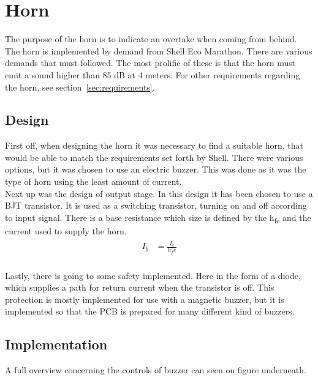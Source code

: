 \section{Horn}
The purpose of the horn is to indicate an overtake when coming from behind. The horn is implemented by demand from Shell Eco Marathon. There are various demands that must followed. The most prolific of these is that the horn must emit a sound higher than 85 dB at 4 meters. For other requirements regarding the horn, see section~\ref{sec:requirements}.  

\subsection{Design}
First off, when designing the horn it was necessary to find a suitable horn, that would be able to match the requirements set forth by Shell. There were various options, but it was chosen to use an electric buzzer. This was done as it was the type of horn using the least amount of current. \\
Next up was the design of output stage. In this design it has been chosen to use a BJT transistor. It is used as a switching transistor, turning on and off according to input signal. There is a base resistance which size is defined by the h\textsubscript{fe} and the current used to supply the horn. \\

\begin{align}
	\begin{split}
		I_b &= \frac{I_c}{h_fe}\\
	\end{split}
\end{align}

Lastly, there is going to some safety implemented. Here in the form of a diode, which supplies a path for return current when the transistor is off. This protection is mostly implemented for use with a magnetic buzzer, but it is implemented so that the PCB is prepared for many different kind of buzzers.   

\subsection{Implementation}
A full overview concerning the controls of buzzer can seen on figure underneath.

